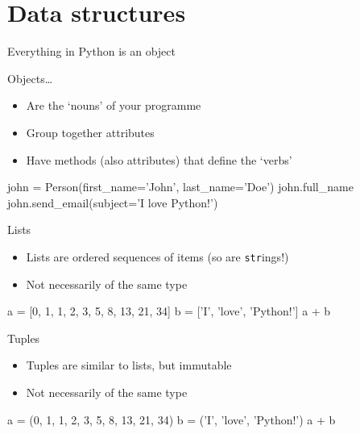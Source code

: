\section{Data structures}

\begin{frame}[fragile]{Everything in Python is an object}
    \begin{block}{Objects\ldots}
        \begin{itemize}
            \item Are the `nouns' of your programme
            \item Group together \alert{attributes}
            \item Have \alert{methods} (also attributes) that define the `verbs'
        \end{itemize}
    \end{block}
    \vfill
    \begin{py3}
        john = Person(first_name='John', last_name='Doe')
        john.full_name
        john.send_email(subject='I love Python!')
    \end{py3}
\end{frame}

\begin{frame}[fragile]{Lists}
    \begin{itemize}
        \item Lists are \alert{ordered sequences} of items
              (so are \texttt{str}ings!)
        \item Not necessarily of the same type
    \end{itemize}
    \vfill
    \begin{py3}
        a = [0, 1, 1, 2, 3, 5, 8, 13, 21, 34]
        b = ['I', 'love', 'Python!']
        a + b
    \end{py3}
\end{frame}

\begin{frame}[fragile]{Tuples}
    \begin{itemize}
        \item Tuples are similar to lists, but \alert{immutable}
        \item Not necessarily of the same type
    \end{itemize}
    \vfill
    \begin{py3}
        a = (0, 1, 1, 2, 3, 5, 8, 13, 21, 34)
        b = ('I', 'love', 'Python!')
        a + b
    \end{py3}
\end{frame}

